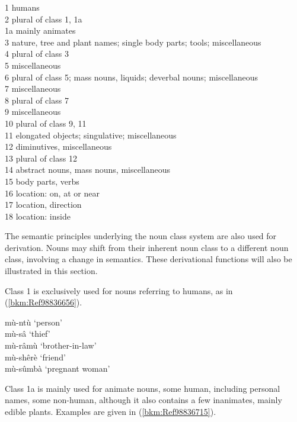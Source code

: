 \ea
\label{bkm:Ref492314267}

  1 \tab humans\\
2 \tab plural of class 1, 1a\\
1a \tab  mainly animates\\
3 \tab nature, tree and plant names; single body parts; tools; miscellaneous\\
4 \tab plural of class 3\\
5 \tab miscellaneous\\
6 \tab plural of class 5; mass nouns, liquids; deverbal nouns; miscellaneous\\
7 \tab miscellaneous\\
8 \tab plural of class 7\\
9 \tab miscellaneous\\
10 \tab plural of class 9, 11\\
11 \tab elongated objects; singulative; miscellaneous\\
12 \tab diminutives, miscellaneous\\
13 \tab plural of class 12\\
14 \tab abstract nouns, mass nouns, miscellaneous\\
15 \tab body parts, verbs\\
16 \tab location: on, at or near\\
17 \tab location, direction\\
18 \tab location: inside
\z

The semantic principles underlying the noun class system are also used for derivation. Nouns may shift from their inherent noun class to a different noun class, involving a change in semantics. These derivational functions will also be illustrated in this section.

Class 1 is exclusively used for nouns referring to humans, as in (\ref{bkm:Ref98836656}).

\ea
\label{bkm:Ref98836656}
mù-ntù  ‘person’\\
mù-sâ    ‘thief’\\
mù-râmù  ‘brother-in-law’\\
mù-shêrè  ‘friend’\\
mù-sûmbà  ‘pregnant woman’
\z

Class 1a is mainly used for animate nouns, some human, including personal names, some non-human, although it also contains a few inanimates, mainly edible plants. Examples are given in (\ref{bkm:Ref98836715}).

